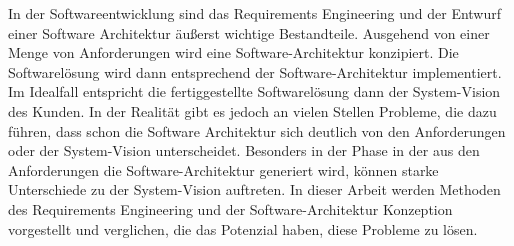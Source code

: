  In der Softwareentwicklung sind das Requirements Engineering und der Entwurf einer Software Architektur \"au\ss{}erst wichtige Bestandteile. Ausgehend von einer Menge von Anforderungen wird eine Software-Architektur konzipiert. Die Softwarel\"osung wird dann entsprechend der Software-Architektur implementiert. Im Idealfall entspricht die fertiggestellte Softwarel\"osung dann der System-Vision des Kunden. In der Realit\"at gibt es jedoch an vielen Stellen Probleme, die dazu f\"uhren, dass schon die Software Architektur sich deutlich von den Anforderungen oder der System-Vision unterscheidet. Besonders in der Phase in der aus den Anforderungen die Software-Architektur generiert wird, k\"onnen starke Unterschiede zu der System-Vision auftreten. In dieser Arbeit werden Methoden des Requirements Engineering und der Software-Architektur Konzeption vorgestellt und verglichen, die das Potenzial haben, diese Probleme zu l\"osen.